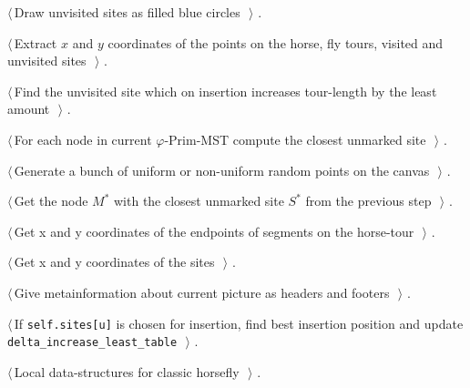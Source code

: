 \documentclass[11.5pt]{report}
\begin{document}
{\begin{list}{}{\setlength{\itemsep}{-\parsep}\setlength{\itemindent}{-\leftmargin}}
\item $\langle\,$Draw unvisited sites as filled blue circles\nobreak\ {\footnotesize {}}$\,\rangle$ {\footnotesize {\NWtxtRefIn} .}
\item $\langle\,$Extract $x$ and $y$ coordinates of the points on the horse, fly tours, visited and unvisited sites\nobreak\ {\footnotesize {}}$\,\rangle$ {\footnotesize {\NWtxtRefIn} .}
\item $\langle\,$Find the unvisited site which on insertion increases tour-length by the least amount\nobreak\ {\footnotesize {}}$\,\rangle$ {\footnotesize {\NWtxtRefIn} .}
\item $\langle\,$For each node in current $\varphi$-Prim-MST compute the closest unmarked site\nobreak\ {\footnotesize {}}$\,\rangle$ {\footnotesize {\NWtxtRefIn} .}
\item $\langle\,$Generate a bunch of uniform or non-uniform random points on the canvas\nobreak\ {\footnotesize {}}$\,\rangle$ {\footnotesize {\NWtxtRefIn} .}
\item $\langle\,$Get the node $M^{*}$ with the closest unmarked site $S^{*}$ from the previous step\nobreak\ {\footnotesize {}}$\,\rangle$ {\footnotesize {\NWtxtRefIn} .}
\item $\langle\,$Get x and y coordinates of the endpoints of segments on the horse-tour\nobreak\ {\footnotesize {}}$\,\rangle$ {\footnotesize {\NWtxtRefIn} .}
\item $\langle\,$Get x and y coordinates of the sites\nobreak\ {\footnotesize {}}$\,\rangle$ {\footnotesize {\NWtxtRefIn} .}
\item $\langle\,$Give metainformation about current picture as headers and footers\nobreak\ {\footnotesize {}}$\,\rangle$ {\footnotesize {\NWtxtRefIn} .}
\item $\langle\,$If \texttt{self.sites[u]} is chosen for insertion, find best insertion position and update \texttt{delta\_increase\_least\_table}\nobreak\ {\footnotesize {}}$\,\rangle$ {\footnotesize {\NWtxtRefIn} .}
\item $\langle\,$Local data-structures for classic horsefly\nobreak\ {\footnotesize {}}$\,\rangle$ {\footnotesize {\NWtxtRefIn} .}

\end{list}}
\end{document}
